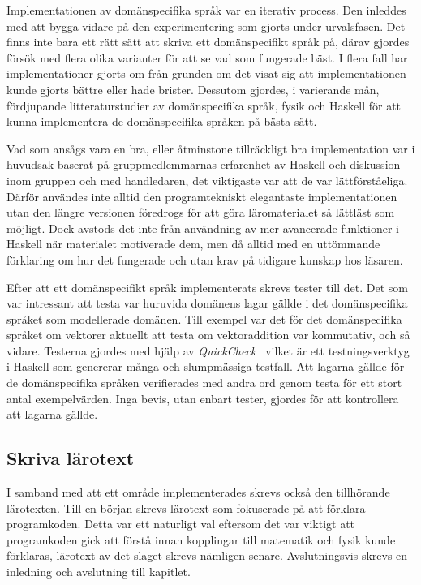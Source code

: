 Implementationen av domänspecifika språk var en iterativ process.
Den inleddes med att
bygga vidare på den experimentering som gjorts under urvalsfasen. Det finns inte bara
ett rätt sätt att skriva ett domänspecifikt språk på, därav gjordes försök med
flera olika varianter för att se vad som fungerade bäst.  I flera fall har implementationer gjorts om från grunden om
det visat sig att implementationen kunde gjorts bättre eller
hade brister. Dessutom gjordes, i varierande mån, fördjupande litteraturstudier av domänspecifika
språk, fysik och Haskell för att kunna implementera de domänspecifika språken på bästa sätt.

Vad som ansågs vara en bra, eller åtminstone tillräckligt bra implementation
var i huvudsak baserat på gruppmedlemmarnas erfarenhet av Haskell och diskussion
inom gruppen och med handledaren, det viktigaste var att de var
lättförståeliga. Därför användes inte alltid den programtekniskt elegantaste
implementationen utan den längre versionen föredrogs för att göra
läromaterialet så lättläst som möjligt. Dock avstods det inte från användning av
mer avancerade funktioner i Haskell när materialet motiverade dem, men då alltid
med en uttömmande förklaring om hur det fungerade och utan krav på tidigare
kunskap hos läsaren.

Efter att ett domänspecifikt språk implementerats skrevs tester till det. Det
som var intressant att testa var huruvida domänens lagar gällde i det domänspecifika språket som modellerade domänen. Till exempel var det för det domänspecifika språket om vektorer aktuellt att testa om vektoraddition var kommutativ, och så vidare.
Testerna gjordes med hjälp av \textit{QuickCheck}~\cite{QC} vilket är ett
testningsverktyg i Haskell som genererar många och slumpmässiga testfall. Att
lagarna gällde för de domänspecifika språken verifierades med andra ord genom
testa för ett stort antal exempelvärden. Inga bevis, utan enbart tester, gjordes för att kontrollera att lagarna gällde.

\subsection{Skriva lärotext}

I samband med att ett område implementerades skrevs också den tillhörande
lärotexten. Till en början skrevs lärotext som fokuserade på att förklara
programkoden. Detta var ett naturligt val eftersom det var viktigt att
programkoden gick att förstå innan kopplingar till matematik och fysik kunde
förklaras, lärotext av det slaget skrevs nämligen senare. Avslutningsvis skrevs
en inledning och avslutning till kapitlet.

